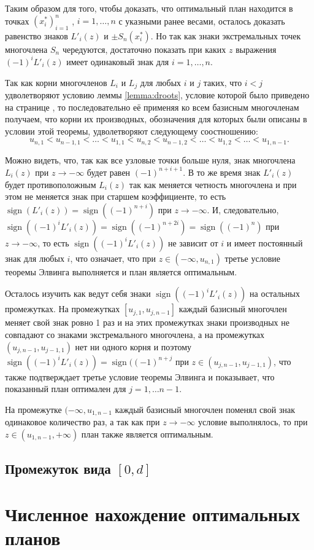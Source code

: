 \documentclass[specialist,
               substylefile = spbu.rtx,
               subf,href,colorlinks=true, 12pt]{disser}
\theoremstyle{definition}
\DeclareMathOperator*{\sign}{sign}
\begin{document}
	Таким образом для того, чтобы доказать, что оптимальный план находится в точках $(x_i^*)_{i=1}^n$ , $i = 1, \ldots, n$ с указными ранее весами, осталось доказать равенство знаков $L'_i(z)$ и $\pm S_n(x_i^*)$. Но так как знаки экстремальных точек многочлена $S_n$ чередуются, достаточно показать при каких $z$ выражения $(-1)^i L'_i(z)$ имеет одинаковый знак для $i=1,\ldots , n$.
	
	Так как корни многочленов $L_i$ и $L_j$ для любых $i$ и $j$ таких, что $i < j$ удволетворяют условию леммы \ref{lemma:droots}, условие которой было приведено на странице \pageref{lemma:droots}, то последовательно её применяя ко всем базисным многочленам получаем, что корни их производных, обозначения для которых были описаны в условии этой теоремы, удволетворяют следующему соостношению:
	\begin{equation}
	\label{eq:droots}
		u_{n, 1} < u_{n-1, 1} < \ldots < u_{1, 1} < u_{n, 2} < u_{n-1, 2} < \ldots < u_{1, 2} < \ldots < u_{1, n-1}.
	\end{equation}
	
	Можно видеть, что, так как все узловые точки больше нуля, знак многочлена $L_i(z)$ при $z \to -\infty$ будет равен $(-1)^{n+i+1}$. В то же время знак $L'_i(z)$ будет противоположным $L_i(z)$ так как меняется четность многочлена и при этом не меняется знак при старшем коэффициенте, то есть $\sign(L'_i(z)) = \sign((-1)^{n+i})$ при $z \to -\infty$. И, следовательно, $\sign((-1)^i L'_i(z)) = \sign((-1)^{n+2i}) = \sign((-1)^{n})$ при $z \to -\infty$, то есть $\sign((-1)^i L'_i(z))$ не зависит от $i$ и имеет постоянный знак для любых $i$, что означает, что при $z \in (-\infty, u_{n, 1})$ третье условие теоремы Элвинга выполняется и план является оптимальным.
	
	Осталось изучить как ведут себя знаки $\sign((-1)^i L'_i(z))$ на остальных промежутках. На промежутках $[u_{j, 1}, u_{j, n-1}]$ каждый базисный многочлен меняет свой знак ровно 1 раз и на этих промежутках знаки производных не совпадают со знаками экстремального многочлена, а на промежутках $(u_{j, n-1}, u_{j-1, 1})$ нет ни одного корня и поэтому $\sign((-1)^i L'_i(z)) = \sign ((-1)^{n + j}$ при $z \in (u_{j, n-1}, u_{j-1, 1})$, что также подтверждает третье условие теоремы Элвинга и показывает, что показанный план оптимален для $j=1, \ldots n-1$.
	
	На промежутке $(-\infty, u_{1, n-1}$ каждый базисный многочлен поменял свой знак одинаковое количество раз, а так как при $z \to -\infty$ условие выполнялось, то при $z \in (u_{1, n-1}, +\infty)$ план также является оптимальным.
	
	\section{Промежуток вида $[0, d]$}
	
	
	\chapter{Численное нахождение оптимальных планов}
	 
	
	
	
	
	
	

	
	\nocite{*}
	
	
	
\end{document}
